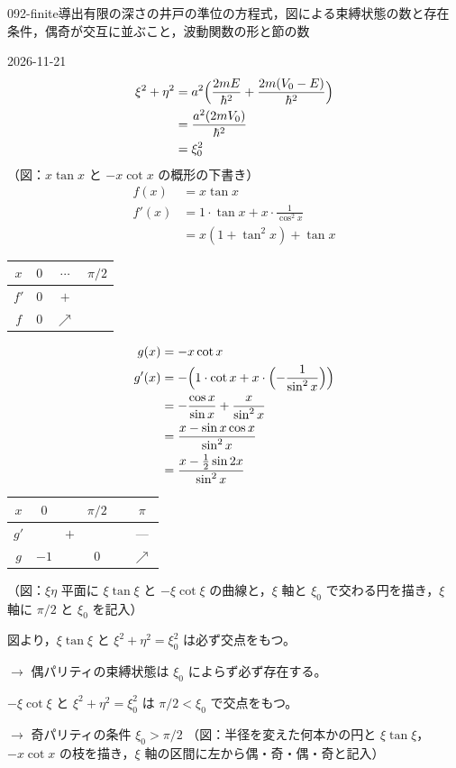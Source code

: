 \documentclass[uplatex,dvipdfmx,a4paper,11pt]{jsarticle}
\begin{document}
\begin{mondai}{092-finite}{導出}{有限の深さの井戸の準位の方程式，図による束縛状態の数と存在条件，偶奇が交互に並ぶこと，波動関数の形と節の数}
\begin{kotaeutsushi}{2026-11-21}
\begin{align*}
\xi^{2}+\eta^{2}&=a^{2}\Bigl(\frac{2mE}{\hbar^{2}}+\frac{2m(V_{0}-E)}{\hbar^{2}}\Bigr)\\
&=\frac{a^{2}(2mV_{0})}{\hbar^{2}}\\
&=\xi_{0}^{2}
\end{align*}
（図：$x\tan x$ と $-x\cot x$ の概形の下書き）
\begin{align*}
f(x)&=x\tan x\\
f'(x)&=1\cdot\tan x+x\cdot\frac{1}{\cos^{2}x}\\
&=x(1+\tan^{2}x)+\tan x
\end{align*}
\begin{center}
\begin{tabular}{c|ccc}
$x$ & $0$ & $\cdots$ & $\pi/2$\\ \hline
$f'$ & $0$ & $+$ & \\ \hline
$f$ & $0$ & $\nearrow$ &
\end{tabular}
\end{center}
\begin{align*}
g(x)&=-x\cot x\\
g'(x)&=-\Bigl(1\cdot\cot x+x\cdot\Bigl(-\frac{1}{\sin^{2}x}\Bigr)\Bigr)\\
&=-\frac{\cos x}{\sin x}+\frac{x}{\sin^{2}x}\\
&=\frac{x-\sin x\cos x}{\sin^{2}x}\\
&=\frac{x-\frac{1}{2}\sin 2x}{\sin^{2}x}
\end{align*}
\begin{center}
\begin{tabular}{c|ccccc}
$x$ & $0$ & & $\pi/2$ & & $\pi$\\ \hline
$g'$ & & $+$ & & & ---\\ \hline
$g$ & $-1$ & & $0$ & & $\nearrow$
\end{tabular}
\end{center}
（図：$\xi\eta$ 平面に $\xi\tan\xi$ と $-\xi\cot\xi$ の曲線と，$\xi$ 軸と $\xi_{0}$ で交わる円を描き，$\xi$ 軸に $\pi/2$ と $\xi_{0}$ を記入）

図より，$\xi\tan\xi$ と $\xi^{2}+\eta^{2}=\xi_{0}^{2}$ は必ず交点をもつ。

$\to$ 偶パリティの束縛状態は $\xi_{0}$ によらず必ず存在する。

$-\xi\cot\xi$ と $\xi^{2}+\eta^{2}=\xi_{0}^{2}$ は $\pi/2<\xi_{0}$ で交点をもつ。

$\to$ 奇パリティの条件 $\xi_{0}>\pi/2$
（図：半径を変えた何本かの円と $\xi\tan\xi$，$-x\cot x$ の枝を描き，$\xi$ 軸の区間に左から偶・奇・偶・奇と記入）


\end{kotaeutsushi}
\end{mondai}
\end{document}
